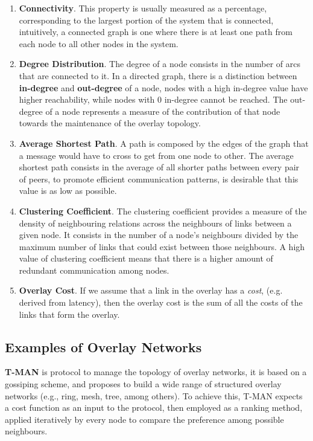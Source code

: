 \begin{enumerate}
    
    \item \textbf{Connectivity}. This property is usually measured as a percentage, corresponding to the largest portion of the system that is connected, intuitively, a connected graph is one where there is at least one path from each node to all other nodes in the system.
    
    \item \textbf{Degree Distribution}. The degree of a node consists in the number of arcs that are connected to it. In a directed graph, there is a distinction between \textbf{in-degree} and \textbf{out-degree} of a node, nodes with a high in-degree value have higher reachability, while nodes with 0 in-degree cannot be reached. The out-degree of a node represents a measure of the contribution of that node towards the maintenance of the overlay topology.
    
    \item \textbf{Average Shortest Path}. A path is composed by the edges of the graph that a message would have to cross to get from one node to other. The average shortest path consists in the average of all shorter paths between every pair of peers, to promote efficient communication patterns, is desirable that this value is as low as possible.
    
    \item \textbf{Clustering Coefficient}. The clustering coefficient provides a measure of the density of neighbouring relations across the neighbours of links between a given node. It consists in the number of a node's neighbours divided by the maximum number of links that could exist between those neighbours. A high value of clustering coefficient means that there is a higher amount of redundant communication among nodes.
    
    \item \textbf{Overlay Cost}. If we assume that a link in the overlay has a \textit{cost}, (e.g. derived from latency), then the overlay cost is the sum of all the costs of the links that form the overlay. 
    
\end{enumerate}

\subsection{Examples of Overlay Networks}

\textbf{T-MAN} \cite{t-man} is protocol to manage the topology of overlay networks, it is based on a gossiping scheme, and proposes to build a wide range of structured overlay networks (e.g., ring, mesh, tree, among others). To achieve this, T-MAN expects a cost function as an input to the protocol, then employed as a ranking method, applied iteratively by every node to compare the preference among possible neighbours. 


